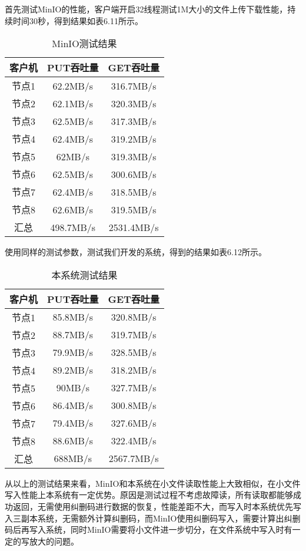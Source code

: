首先测试MinIO的性能，客户端开启32线程测试1M大小的文件上传下载性能，持续时间30秒，得到结果如表6.11所示。

\begin{table}[h]
    \centering
    \caption{MinIO测试结果}
    \begin{tabular}{ccc}
      \toprule
      客户机   & PUT吞吐量  & GET吞吐量 \\
      \midrule
      节点1  & 62.2MB/s  & 316.7MB/s \\
      节点2  & 62.1MB/s  & 320.3MB/s \\
      节点3  & 62.5MB/s  & 317.3MB/s \\
      节点4  & 62.4MB/s  & 319.2MB/s \\
      节点5  & 62MB/s    & 319.3MB/s \\
      节点6  & 62.5MB/s  & 300.6MB/s \\
      节点7  & 62.4MB/s  & 318.5MB/s \\
      节点8  & 62.6MB/s  & 319.5MB/s \\
      汇总   & 498.7MB/s & 2531.4MB/s \\
      \bottomrule
    \end{tabular}
\end{table}

使用同样的测试参数，测试我们开发的系统，得到的结果如表6.12所示。

\begin{table}[h]
    \centering
    \caption{本系统测试结果}
    \begin{tabular}{ccc}
      \toprule
      客户机   & PUT吞吐量  & GET吞吐量 \\
      \midrule
      节点1  & 85.8MB/s  & 320.8MB/s \\
      节点2  & 88.7MB/s  & 319.7MB/s \\
      节点3  & 79.9MB/s  & 328.5MB/s \\
      节点4  & 89.2MB/s  & 318.2MB/s \\
      节点5  & 90MB/s    & 327.7MB/s \\
      节点6  & 86.4MB/s  & 300.8MB/s \\
      节点7  & 79.4MB/s  & 327.6MB/s \\
      节点8  & 88.6MB/s  & 322.4MB/s \\
      汇总   & 688MB/s   & 2567.7MB/s \\
      \bottomrule
    \end{tabular}
\end{table}

从以上的测试结果来看，MinIO和本系统在小文件读取性能上大致相似，在小文件写入性能上本系统有一定优势。原因是测试过程不考虑故障读，所有读取都能够成功返回，无需使用纠删码进行数据的恢复，性能差距不大，而写入时本系统优先写入三副本系统，无需额外计算纠删码，而MinIO使用纠删码写入，需要计算出纠删码后再写入系统，同时MinIO需要将小文件进一步切分，在文件系统中写入时有一定的写放大的问题。

